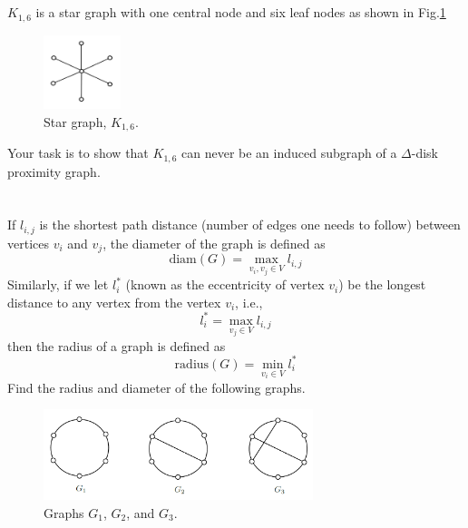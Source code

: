 \documentclass[]{article}
\numberwithin{equation}{section}
\renewcommand{\figurename}{Fig.}
\newcommand{\diam}{\text{diam}}
\newcommand{\radius}{\text{radius}}
\begin{document}
\section{}
$K_{1,6}$ is a star graph with one central node and six leaf nodes as shown in \figurename\ref{fig:pblm5}

\begin{figure}[h]
	\centering
	\includegraphics[width=0.2\textwidth]{figs/pblm5.png}
	\caption{Star graph, $K_{1,6}$.}
	\label{fig:pblm5}
\end{figure}

Your task is to show that $K_{1,6}$ can never be an induced subgraph of a $\Delta$-disk proximity graph.










\section{}
If $l_{i,j}$ is the shortest path distance (number of edges one needs to follow) between vertices $v_i$ and $v_j$, 
the diameter of the graph is defined as\[
	\diam(G) = \max_{v_i,v_j \in V} l_{i,j}
\] Similarly, if we let $l_{i}^{*}$ (known as the eccentricity of vertex $v_i$) be the longest distance to any vertex from the vertex $v_i$, i.e.,\[
	l_{i}^{*} = \max_{v_j \in V} l_{i,j}
\] then the radius of a graph is defined as\[
	\radius(G) = \min_{v_i \in V} l_{i}^{*}
\] Find the radius and diameter of the following graphs.

\begin{figure}[h]
	\centering
	\includegraphics[width=0.7\textwidth]{figs/pblm6.png}
	\caption{Graphs $G_1$, $G_2$, and $G_3$.}
	\label{fig:pblm6}
\end{figure}
\end{document}
